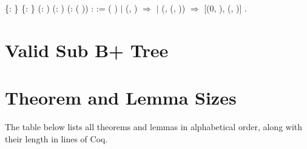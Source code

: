 \begin{coqdoccode}
\coqdocnoindent
{}  \{: \} \{: \} (: ) (: ) (: (  )) : 
\coqdoceol
{}   :=\coqdoceol
\coqdocindent{1.00em}
  ( )    \coqdoceol
\coqdocindent{2.00em}
\ensuremath{|} (, ) \ensuremath{\Rightarrow} \coqdoceol
\coqdocindent{2.00em}
\ensuremath{|} (,  (, )) \ensuremath{\Rightarrow}    [(0, ), (, )]\coqdoceol
\coqdocindent{1.00em}
.\coqdoceol
\coqdocemptyline
\end{coqdoccode}

\newpage

\section{Valid Sub B+ Tree}
\label{app:valid_sub_bplustree}


\newpage

\section{Theorem and Lemma Sizes}
\label{app:lemma_sizes}
The table below lists all theorems and lemmas in alphabetical order, along with their length in lines of Coq.
\\

